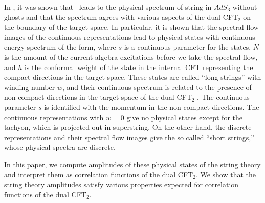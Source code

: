 In \first, it was shown that \hilbertspace\ leads to
the physical spectrum of string in $AdS_3$ without ghosts
and that the spectrum agrees with various aspects of the dual CFT$_2$
on the boundary of the target space. In particular,
it is shown that the spectral flow images
of the continuous representations lead to physical states with
continuous energy spectrum of the form,
\eqn{}
where $s$ is a continuous parameter for the states, $N$ is
the amount of the current algebra excitations before
we take the spectral flow,
and $h$ is the conformal weight of the state in the internal CFT
representing the compact directions in the target space.
These states are called ``long strings''  with winding number $w$,
and their continuous spectrum is related to the presence
of  non-compact directions in the target space of the dual CFT$_2$
.
The continuous parameter $s$ is identified with the momentum
in the non-compact directions. The continuous representations
with $w=0$ give no physical states except for the tachyon,
which is projected out in superstring. On the other hand,
the discrete representations and their spectral flow
images give the so called ``short strings,'' whose physical spectra
are discrete.



In this paper, we compute amplitudes of these physical states
of the string theory and interpret  them as  correlation functions
of the dual CFT$_2$. We show that the string theory
amplitudes satisfy various properties expected
for correlation functions of the dual CFT$_2$.

